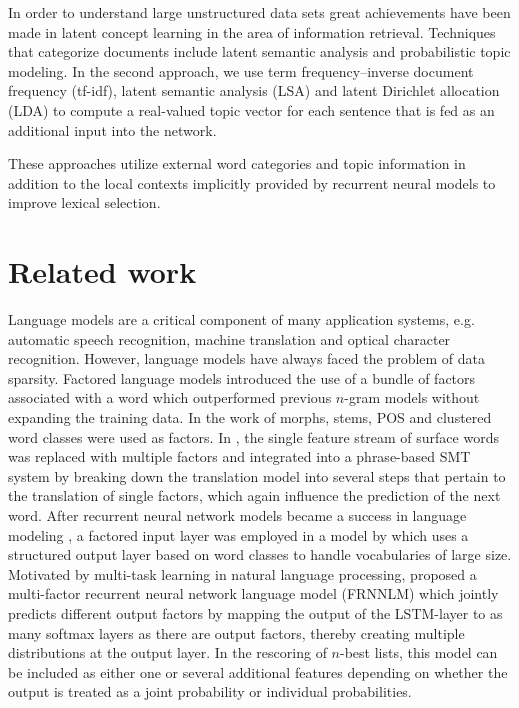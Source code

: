 \documentclass[a4paper]{article}
\begin{document}
In order to understand large unstructured data sets great achievements have been made in latent concept learning in the area of information retrieval. Techniques that categorize documents include latent semantic analysis and probabilistic topic modeling. In the second approach, we use term frequency–inverse document frequency (tf-idf), latent semantic analysis (LSA) and latent Dirichlet allocation (LDA) to compute a real-valued topic vector for each sentence that is fed as an additional input into the network. 

These approaches utilize external word categories and topic information in addition to the local contexts implicitly provided by recurrent neural models to improve lexical selection. 


\section{Related work}
Language models are a critical component of many application systems, e.g. automatic speech recognition, machine translation and optical character recognition. However, language models have always faced the problem of data sparsity. Factored language models \cite{bilmes2003factored} introduced the use of a bundle of factors associated with a word which outperformed previous $n$-gram models without expanding the training data. In the work of \cite{bilmes2003factored} morphs, stems, POS and clustered word classes were used as factors. In \cite{koehn2007factored}, the single feature stream of surface words was replaced with multiple factors and integrated into a phrase-based SMT system by breaking down the translation model into several steps that pertain to the translation of single factors, which again influence the prediction of the next word.
After recurrent neural network models became a success in language modeling \cite{mikolov2010recurrent}, a factored input layer was employed in a model by \cite{wu2012factored} which uses a structured output layer based on word classes to handle vocabularies of large size.
Motivated by multi-task learning in natural language processing, \cite{niehuesusing} proposed a multi-factor recurrent neural network language model (FRNNLM) which jointly predicts different output factors by mapping the output of the LSTM-layer \cite{hochreiter1997long} to as many softmax layers as there are output factors, thereby creating multiple distributions at the output layer. In the rescoring of $n$-best lists, this model can be included as either one or several additional features depending on whether the output is treated as a joint probability or individual probabilities.
\end{document}
